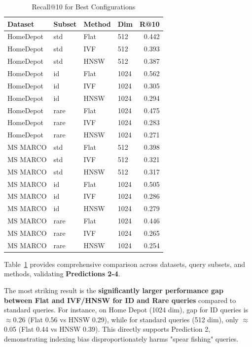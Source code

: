 \documentclass[conference,anonymous]{IEEEtran}
\begin{document}
\begin{table}[t]
\centering
\small
\caption{Recall@10 for Best Configurations}
\label{tab:detailed-results}
\begin{tabular}{llllr}
\toprule
\textbf{Dataset} & \textbf{Subset} & \textbf{Method} & \textbf{Dim} & \textbf{R@10} \\
\midrule
HomeDepot & std & Flat & 512 & 0.442 \\
HomeDepot & std & IVF & 512 & 0.393 \\
HomeDepot & std & HNSW & 512 & 0.387 \\
\midrule
HomeDepot & id & Flat & 1024 & 0.562 \\
HomeDepot & id & IVF & 1024 & 0.305 \\
HomeDepot & id & HNSW & 1024 & 0.294 \\
\midrule
HomeDepot & rare & Flat & 1024 & 0.475 \\
HomeDepot & rare & IVF & 1024 & 0.283 \\
HomeDepot & rare & HNSW & 1024 & 0.271 \\
\midrule
MS MARCO & std & Flat & 512 & 0.398 \\
MS MARCO & std & IVF & 512 & 0.321 \\
MS MARCO & std & HNSW & 512 & 0.317 \\
\midrule
MS MARCO & id & Flat & 1024 & 0.505 \\
MS MARCO & id & IVF & 1024 & 0.286 \\
MS MARCO & id & HNSW & 1024 & 0.279 \\
\midrule
MS MARCO & rare & Flat & 1024 & 0.446 \\
MS MARCO & rare & IVF & 1024 & 0.265 \\
MS MARCO & rare & HNSW & 1024 & 0.254 \\
\bottomrule
\end{tabular}
\end{table}

Table~\ref{tab:detailed-results} provides comprehensive comparison across datasets, query subsets, and methods, validating \textbf{Predictions 2-4}.

The most striking result is the \textbf{significantly larger performance gap between Flat and IVF/HNSW for ID and Rare queries} compared to standard queries. For instance, on Home Depot (1024 dim), gap for ID queries is $\approx$0.26 (Flat 0.56 vs HNSW 0.29), while for standard queries (512 dim), only $\approx$0.05 (Flat 0.44 vs HNSW 0.39). This directly supports Prediction 2, demonstrating indexing bias disproportionately harms "spear fishing" queries.
\end{document}
